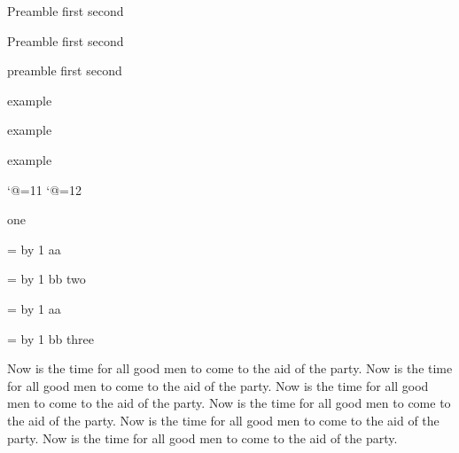 \bye
{}

\pex[lingstyle=UBC]
Preamble
\a first
\a second
\xe

\pex[exno=300,lingstyle=UBC]
Preamble
\a first
\a second
\xe

\bye

\pex[numoffset=!2em] preamble
\a first
\a second
\xe

\ex example\xe

\ex example\xe

\ex example\xe

\bye




%
\catcode`@=11
\newcount\pexsubcnt
\newdimen\aa@add
\def\aa{\par
   \if@firstaalabel
      \ifdim\ep@aaleftskip=0pt
         \ep@aaleftskip=\leftskip
         \advance\ep@aaleftskip by \lingsublabeloffset
         \aa@add=\lingsubtextoffset
         \advance\aa@add by \lingsublabelwidth
         \advance\ep@aaleftskip by \aa@add
         \fi
      \@firstaalabelfalse
      \pexsubcnt=0
      \fi
   \leftskip=\ep@aaleftskip
   \leavevmode
   \advance\pexsubcnt by 1
}
\catcode`@=12

\pex
\a  one
\aa aa
\aa bb
\a  two
\aa aa
\aa bb
\a  three
\xe


\bye

\vsize=3.6in
\hsize=3in

\leavevmode
\vskip2.1in

\ex[exbreakfil=0pt plus 1.6in]
Now is the time for all good men to come to the aid of the party.
Now is the time for all good men to come to the aid of the party.
Now is the time for all good men to come to the aid of the party.
Now is the time for all good men to come to the aid of the party.
Now is the time for all good men to come to the aid of the party.
Now is the time for all good men to come to the aid of the party.
\xe
\endinput

\pex
\a
Now is the time for all good men to come to the aid of the
party.
\a
Now is the time for all good men to come to the aid of the party.
\a
Now is the time for all good men to come to the aid of the party.
\a
Now is the time for all good men to come to the aid of the party.
\a
Now is the time for all good men to come to the aid of the party.
\a
Now is the time for all good men to come to the aid of the party.
\a
Now is the time for all good men to come to the aid of the party.
\xe



